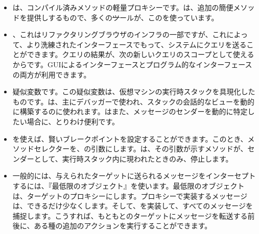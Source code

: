 \documentclass[a4paper,10pt,twoside]{book}
\begin{document}
\begin{itemize}
\item {}は、コンパイル済みメソッドの軽量プロキシーです。は、追加の簡便メソッドを提供しするもので、多くの\st ツールが、このを使っています。
\item {}、これはリファクタリングブラウザのインフラの一部ですが、これによって、より洗練されたインターフェースでもって、システムにクエリを送ることができます。クエリの結果が、次の新しいクエリのスコープとして使えるからです。GUIによるインターフェースとプログラム的なインターフェースの両方が利用できます。%
\item {}疑似変数です。この疑似変数は、仮想マシンの実行時スタックを具現化したものです。は、主にデバッガーで使われ、スタックの会話的なビューを動的に構築するのに使われます。はまた、メッセージのセンダーを動的に特定したい場合に、とりわけ便利です。%
\item {}を使えば、賢いブレークポイントを設定することができます。このとき、メソッドセレクターを、の引数にします。は、その引数が示すメソッドが、センダーとして、実行時スタック内に現われたときのみ、停止します。
\item 一般的には、与えられたターゲットに送られるメッセージをインターセプトするには、『最低限のオブジェクト』を使います。最低限のオブジェクトは、ターゲットのプロキシーにします。プロキシーで実装するメッセージは、できるだけ少なくします。そして、を実装して、すべてのメッセージを捕捉します。こうすれば、もともとのターゲットにメッセージを転送する前後に、ある種の追加のアクションを実行することができます。%

\end{itemize}
\end{document}
